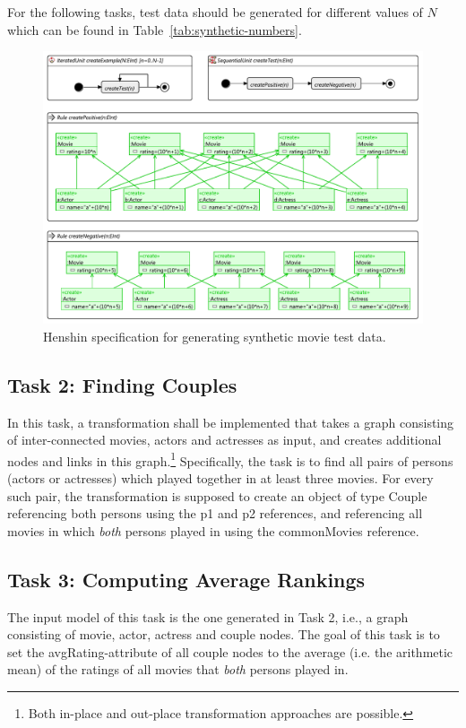 \documentclass[a4paper,11pt]{article}
\newcommand{\p}[1]{\textsf{\small #1}}
\begin{document}
For the following tasks, test data should be generated for different values of
$N$ which can be found in Table~\ref{tab:synthetic-numbers}.


\begin{figure}[p]
\centering
\includegraphics[scale=1.0,angle=90]{gen-test-data4}
\caption{Henshin specification for generating synthetic movie test data.}
\label{fig:gen-test-data}
\end{figure}

\subsection{Task 2: Finding Couples}

In this task, a transformation shall be implemented that takes a graph
consisting of inter-connected movies, actors and actresses as input, and
creates additional nodes and links in this graph.\footnote{Both in-place and
  out-place transformation approaches are possible.} Specifically, the task is
to find all pairs of persons (actors or actresses) which played together in at
least three movies.  For every such pair, the transformation is supposed to
create an object of type \p{Couple} referencing both persons using the
\p{p1} and \p{p2} references, and referencing all movies in which
\emph{both} persons played in using the \p{commonMovies} reference.

\subsection{Task 3: Computing Average Rankings}

The input model of this task is the one generated in Task 2,
i.e., a graph consisting of movie, actor, actress and couple
nodes. The goal of this task is to set the \p{avgRating}-attribute
of all couple nodes to the average (i.e. the
arithmetic mean) of the ratings of all movies that
\emph{both} persons played in.
\end{document}
